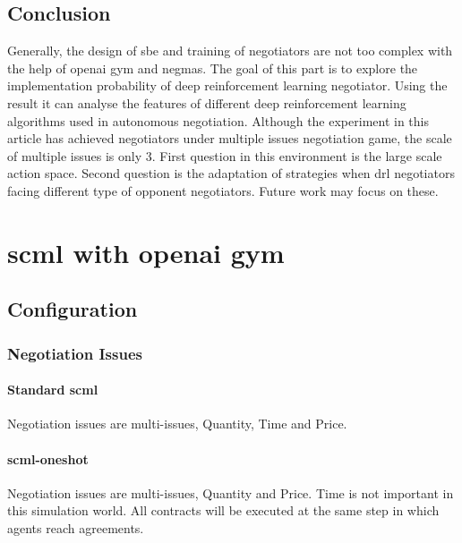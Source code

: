 \subsection{Conclusion}
Generally, the design of \gls{sbe} and training of negotiators are not too complex with the help of \gls{openai gym} and \gls{negmas}. The goal of this part is to explore the implementation probability of deep reinforcement learning negotiator. Using the result it can analyse the features of different deep reinforcement learning algorithms used in autonomous negotiation. Although the experiment in this article has achieved negotiators under multiple issues negotiation game, the scale of multiple issues is only 3. First question in this environment is the large scale action space. Second question is the adaptation of strategies when \gls{drl} negotiators facing different type of opponent negotiators. Future work may focus on these. 

\section{\gls{scml} with \gls{openai gym}}
\subsection{Configuration}
\subsubsection{Negotiation Issues}
\paragraph{Standard \gls{scml}} Negotiation issues are multi-issues, Quantity, Time and Price. 
\paragraph{\gls{scml-oneshot}} Negotiation issues are multi-issues, Quantity and Price. Time is not important in this simulation world. All contracts will be executed at the same step in which agents reach agreements.

